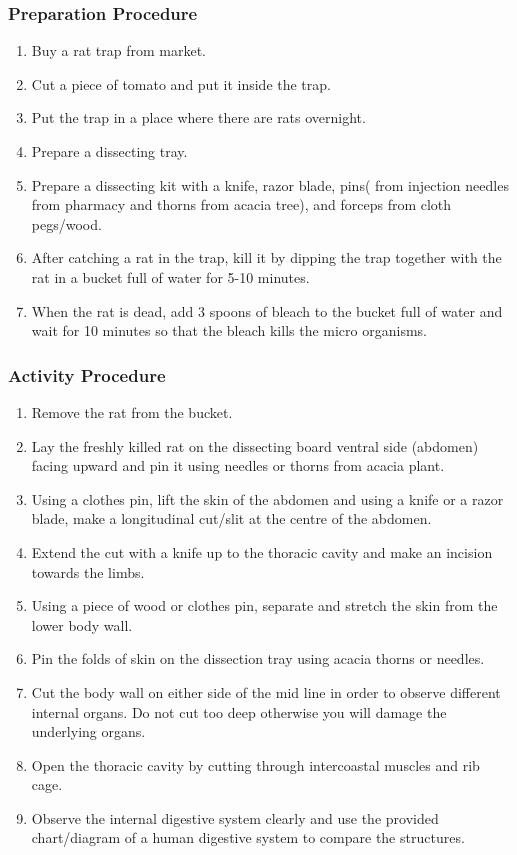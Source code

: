 \subsubsection*{Preparation Procedure}
\begin{enumerate}
\item{Buy a rat trap from market.}
\item{Cut a piece of tomato and put it inside the trap.}
\item{Put the trap in a place where there are rats overnight.}
\item{Prepare a dissecting tray.}
\item{Prepare a dissecting kit with a knife, razor blade, pins( from injection needles from pharmacy and thorns from acacia tree), and forceps from cloth pegs/wood.}
\item{After catching a rat in the trap, kill it by dipping the trap together with the rat in a bucket full of water for 5-10 minutes.}
\item{When the rat is dead, add 3 spoons of bleach to the bucket full of water and wait for 10 minutes so that the bleach kills the micro organisms.}
\end{enumerate}

\subsubsection*{Activity Procedure}
\begin{enumerate}
\item{Remove the rat from the bucket.}
\item{Lay the freshly killed rat on the dissecting board ventral side (abdomen) facing upward and pin it using needles or thorns from acacia plant.}
\item{Using a clothes pin, lift the skin of the abdomen and using a knife or a razor blade, make a longitudinal cut/slit at the centre of the abdomen.}
\item{Extend the cut with a knife up to the thoracic cavity and make an incision towards the limbs.}
\item{Using a piece of wood or clothes pin, separate and stretch the skin from the lower body wall.}
\item{Pin the folds of skin on the dissection tray using acacia thorns or needles.}
\item{Cut the body wall on either side of the mid line in order to observe different internal organs. Do not cut too deep otherwise you will damage the underlying organs.}
\item{Open the thoracic cavity by cutting through intercoastal muscles and rib cage.}
\item{Observe the internal digestive system clearly and use the provided chart/diagram of a human digestive system to compare the structures.}
\end{enumerate}

